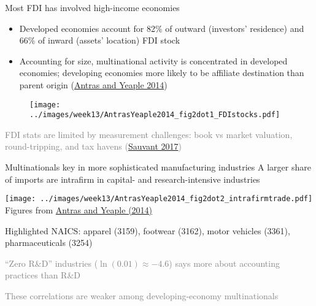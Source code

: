 \documentclass[11pt,notes=hide,aspectratio=169]{beamer}
\begin{document}
\begin{frame}{Most FDI has involved high-income economies}
\begin{itemize}
	\item {\small Developed economies account for 82\% of outward (investors' residence) and 66\% of inward (assets' location) FDI stock\par}
	\item {\small Accounting for size, multinational activity is concentrated in developed economies; developing economies more likely to be affiliate destination than parent origin {\footnotesize(\href{http://scholar.harvard.edu/antras/publications/multinational-firms-and-structure-international-trade}{Antras and Yeaple 2014})} \par}
\end{itemize}
\vspace{-2mm}
\begin{center}\begin{figure}\texttt{[image: ../images/week13/AntrasYeaple2014\_fig2dot1\_FDIstocks.pdf]}\end{figure}\end{center}
\vspace{-5mm}
{\textcolor{gray}{\scriptsize FDI stats are limited by measurement challenges: book vs market valuation, round-tripping, and tax havens (\href{http://ccsi.columbia.edu/files/2016/10/No-215-Sauvant-FINAL.pdf}{Sauvant 2017})}\par}
\end{frame}
\begin{frame}{Multinationals key in more sophisticated manufacturing industries}
A larger share of imports are intrafirm in capital- and research-intensive industries 
\begin{center}
\texttt{[image: ../images/week13/AntrasYeaple2014\_fig2dot2\_intrafirmtrade.pdf]}\\
\vspace{-2mm}
{\footnotesize Figures from \href{http://scholar.harvard.edu/antras/publications/multinational-firms-and-structure-international-trade}{Antras and Yeaple (2014)}} \\
{\tiny Highlighted NAICS: apparel (3159), footwear (3162), motor vehicles (3361), pharmaceuticals (3254) \par}
\end{center}
\begin{itemize}
{\footnotesize 
	\item \textcolor{gray}{``Zero R\&D'' industries ($\ln(0.01)\approx -4.6$) says more about accounting practices than R\&D}
	\item \textcolor{gray}{These correlations are weaker among developing-economy multinationals}
}
\end{itemize}
\end{frame}
\end{document}
